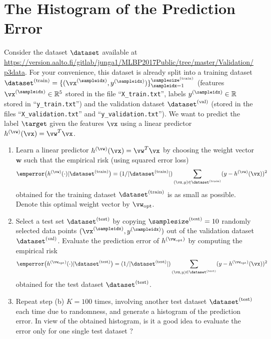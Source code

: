 \documentclass[article,11pt]{article}
\begin{document}
\newpage
\section{The Histogram of the Prediction Error} \label{problem 2}

Consider the dataset $\dataset$ available at \url{https://version.aalto.fi/gitlab/junga1/MLBP2017Public/tree/master/Validation/p3data}. 
For your convenience, this dataset is already split into a training dataset $\dataset^{(\rm train)}= \{ (\vx^{(\sampleidx)},y^{(\sampleidx)})\}_{\sampleidx=1}^{\samplesize^{(\rm train)}}$ 
(features $\vx^{(\sampleidx)} \in \mathbb{R}^{5}$ stored in the file ``\texttt{X\_train.txt}'', labels $y^{(\sampleidx)} \in \mathbb{R}$ stored in ``\texttt{y\_train.txt}'') 
and the validation dataset $\dataset^{(\rm val)}$ (stored in the files ``\texttt{X\_validation.txt}'' and  ``\texttt{y\_validation.txt}''). 
We want to predict the label $\target$ given the features $\vx$ using a linear predictor $h^{(\vw)}(\vx)=\vw^{T} \vx$.

\begin{enumerate}
	\item %
	Learn a linear predictor $h^{(\vw)}(\vx)=\vw^{T} \vx$ by choosing the weight vector $\mathbf{w}$ such that the empirical risk (using squared error loss)
\begin{equation} 
\emperror \big( h^{(\vw)}(\cdot)| \dataset^{(\rm train)} \big) = (1/|\dataset^{(\rm train)}|) \sum_{(\vx,y) \in \dataset^{(\rm train)}} (y - h^{(\vw)}(\vx))^{2}   \nonumber
\end{equation} 
obtained for the training dataset $\dataset^{(\rm train)}$ is as small as possible. Denote this optimal weight vector by $\vw_{\rm opt}$.
	\item Select a test set $\dataset^{(\rm test)}$ by copying $\samplesize^{(\rm test)}= 10$ randomly selected 
	data points $(\vx^{(\sampleidx)},y^{(\sampleidx)})$ out of the validation dataset $\dataset^{(\rm val)}$. 
	Evaluate the prediction error of $h^{(\vw_{\rm opt})}$ by computing the empirical risk 
\begin{equation} 
\emperror \big( h^{(\vw_{\rm opt})}(\cdot)| \dataset^{(\rm test)} \big) = (1/|\dataset^{(\rm test)}|) \sum_{(\vx,y) \in \dataset^{(\rm test)}} (y - h^{(\vw_{\rm opt})}(\vx))^{2}   \nonumber
\end{equation} 	
	obtained for the test dataset $\dataset^{(\rm test)}$.
	\item Repeat step (b) $K = 100$ times, involving another test dataset  $\dataset^{(\rm test)}$ each time due to randomness, 
	and generate a histogram of the prediction error. In view of the obtained histogram, is it a good idea to evaluate the 
	error only for one single test dataset ?  
\end{enumerate}
	
\end{document}
